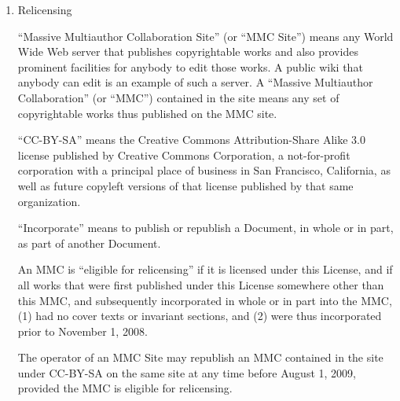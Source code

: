 \begin{enumerate}
\item Relicensing

``Massive Multiauthor Collaboration Site'' (or ``MMC Site'') means any
World Wide Web server that publishes copyrightable works and also
provides prominent facilities for anybody to edit those works.  A
public wiki that anybody can edit is an example of such a server.  A
``Massive Multiauthor Collaboration'' (or ``MMC'') contained in the
site means any set of copyrightable works thus published on the MMC
site.

``CC-BY-SA'' means the Creative Commons Attribution-Share Alike 3.0
license published by Creative Commons Corporation, a not-for-profit
corporation with a principal place of business in San Francisco,
California, as well as future copyleft versions of that license
published by that same organization.

``Incorporate'' means to publish or republish a Document, in whole or
in part, as part of another Document.

An MMC is ``eligible for relicensing'' if it is licensed under this
License, and if all works that were first published under this License
somewhere other than this MMC, and subsequently incorporated in whole
or in part into the MMC, (1) had no cover texts or invariant sections,
and (2) were thus incorporated prior to November 1, 2008.

The operator of an MMC Site may republish an MMC contained in the site
under CC-BY-SA on the same site at any time before August 1, 2009,
provided the MMC is eligible for relicensing.

\end{enumerate}
\label{txt:FDLEnd}

\normalsize